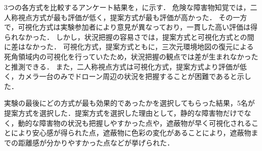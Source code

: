 \documentclass[a4paper,11pt]{ujreport}
\begin{document}
3つの各方式を比較するアンケート結果を，に示す．
危険な障害物知覚では，二人称視点方式が最も評価が低く，提案方式が最も評価が高かった．
その一方で，可視化方式は実験参加者により意見が異なっており，一貫した高い評価は得られなかった．
しかし，状況把握の容易さでは，提案方式と可視化方式との間に差はなかった．
可視化方式，提案方式ともに，三次元環境地図の復元による死角領域内の可視化を行っていたため，状況把握の観点では差が生まれなかったと推測できる．
また，二人称視点方式は可視化方式，提案方式より評価が低く，カメラ一台のみでドローン周辺の状況を把握することが困難であると示した．

実験の最後にどの方式が最も効果的であったかを選択してもらった結果，5名が提案方式を選択した．提案方式を選択した理由として，静的な障害物だけでなく，動的な障害物の状況も把握しやすかった点や，遮蔽物が早く可視化されることにより安心感が得られた点，遮蔽物に色彩の変化があることにより，遮蔽物までの距離感が分かりやすかった点などが挙げられた．

\end{document}
